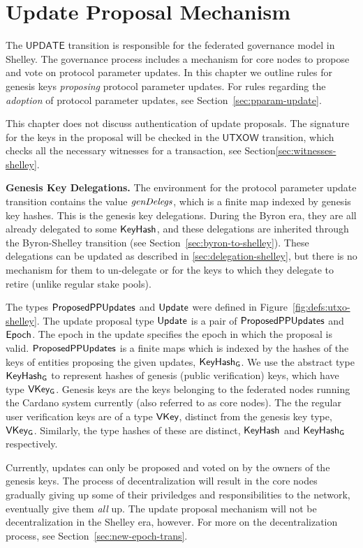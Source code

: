 \section{Update Proposal Mechanism}
\label{sec:update}


The $\mathsf{UPDATE}$ transition is responsible for the federated governance model in Shelley.
The governance process includes a mechanism for core nodes to propose and vote on
protocol parameter updates. In this chapter we
outline rules for genesis keys \textit{proposing} protocol parameter updates.
For rules regarding the \textit{adoption} of protocol
parameter updates, see Section~\ref{sec:pparam-update}.

This chapter does not discuss authentication of update proposals.
The signature for the keys in the proposal will be checked in the
$\mathsf{UTXOW}$ transition, which checks all the necessary witnesses
for a transaction, see Section\ref{sec:witnesses-shelley}.

\textbf{Genesis Key Delegations.} The environment for the protocol parameter
update transition contains the value $\mathit{genDelegs}$,
which is a finite map indexed by genesis key hashes.
This is the genesis key delegations. During the Byron era, they are all
already delegated to some $\mathsf{KeyHash}$, and these delegations are inherited
through the Byron-Shelley transition (see Section~\ref{sec:byron-to-shelley}).
These delegations can be updated as described in \ref{sec:delegation-shelley},
but there is no mechanism for them to un-delegate or for the keys to which they delegate
to retire (unlike regular stake pools).

The types $\mathsf{ProposedPPUpdates}$ and $\mathsf{Update}$ were defined in
Figure~\ref{fig:defs:utxo-shelley}.
The update proposal type $\mathsf{Update}$ is a pair of $\mathsf{ProposedPPUpdates}$ and $\mathsf{Epoch}$.
The epoch in the update specifies the epoch in which the proposal is valid.
$\mathsf{ProposedPPUpdates}$ is a finite maps which is indexed by the hashes of the keys of
entities proposing the given updates, $\mathsf{KeyHash_G}$.
We use the abstract type $\mathsf{KeyHash_G}$ to represent hashes of genesis
(public verification) keys, which have type $\mathsf{VKey_G}$.
Genesis keys are the keys belonging to the federated
nodes running the Cardano system currently (also referred to as core nodes).
The the regular user verification keys are of a type $\mathsf{VKey}$, distinct from the
genesis key type, $\mathsf{VKey_G}$. Similarly, the type hashes of these
are distinct, $\mathsf{KeyHash}$ and $\mathsf{KeyHash_G}$ respectively.

Currently, updates can only be proposed and voted on by the owners of the genesis keys.
The process of decentralization will result in the core nodes gradually giving up
some of their priviledges and responsibilities to the network,
eventually give them \textit{all} up.
The update proposal mechanism will not be decentralization in the Shelley era, however.
For more on the decentralization process, see Section~\ref{sec:new-epoch-trans}.

